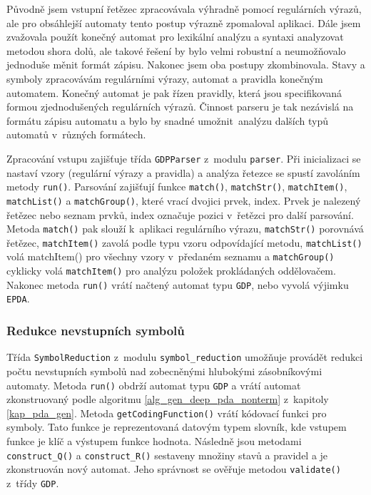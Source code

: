 Původně jsem vstupní řetězec zpracovávala výhradně pomocí regulárních výrazů, ale pro obsáhlejší automaty tento postup výrazně zpomaloval aplikaci. Dále jsem zvažovala použít konečný automat pro lexikální analýzu a syntaxi analyzovat metodou shora dolů, ale takové řešení by bylo velmi robustní a neumožňovalo jednoduše měnit formát zápisu. Nakonec jsem oba postupy zkombinovala. Stavy a symboly zpracovávám regulárními výrazy, automat a pravidla konečným automatem. Konečný automat je pak řízen pravidly, která jsou specifikovaná formou zjednodušených regulárních výrazů. Činnost parseru je tak nezávislá na formátu zápisu automatu a bylo by snadné umožnit~analýzu dalších typů automatů v~různých formátech.

Zpracování vstupu zajišťuje třída \texttt{GDPParser} z~modulu \texttt{parser}. 
Při inicializaci se nastaví vzory (regulární výrazy a pravidla) a analýza řetezce se spustí zavoláním metody \texttt{run()}. Parsování zajišťují funkce \texttt{match()}, \texttt{matchStr()}, \texttt{matchItem()}, \texttt{matchList()} a \texttt{matchGroup()}, které vrací dvojici prvek, index. Prvek je nalezený řetězec nebo seznam prvků, index označuje pozici v~řetězci pro další parsování. Metoda \texttt{match()} pak slouží k~aplikaci regulárního výrazu, \texttt{matchStr()} porovnává řetězec, \texttt{matchItem()} zavolá podle typu vzoru odpovídající metodu, \texttt{matchList()} volá matchItem() pro všechny vzory v~předaném seznamu a \texttt{matchGroup()} cyklicky volá \texttt{matchItem()} pro analýzu položek prokládaných oddělovačem. Nakonec metoda \texttt{run()} vrátí načtený automat typu \texttt{GDP}, nebo vyvolá výjimku \texttt{EPDA}.

\subsubsection{Redukce nevstupních symbolů}

Třída \texttt{SymbolReduction} z~modulu \texttt{symbol\_reduction} umožňuje provádět redukci počtu nevstupních symbolů nad zobecněnými hlubokými zásobníkovými automaty. Metoda \texttt{run()} obdrží automat typu \texttt{GDP} a vrátí automat zkonstruovaný podle algoritmu \ref{alg_gen_deep_pda_nonterm} z~kapitoly \ref{kap_pda_gen}.
Metoda \texttt{getCodingFunction()} vrátí kódovací funkci pro symboly. Tato funkce je reprezentovaná datovým typem slovník, kde vstupem funkce je klíč a výstupem funkce hodnota. Následně jsou metodami \texttt{construct\_Q()} a \texttt{construct\_R()} sestaveny množiny stavů a pravidel a je zkonstruován nový automat. Jeho správnost se ověřuje metodou \texttt{validate()} z~třídy \texttt{GDP}.

